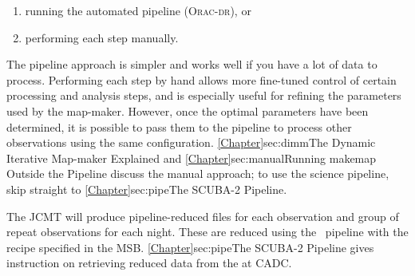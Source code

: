 \begin{enumerate}
\item running the automated pipeline (\textsc{Orac-dr}), or
\item performing each step manually.
\end{enumerate}

The pipeline approach is simpler and works well if you have a
lot of data to process.
Performing each step by hand allows more fine-tuned control of certain
processing and analysis steps, and is especially useful for refining
the parameters used by the map-maker. However, once the optimal
parameters have been determined, it is possible to pass them to the
pipeline to process other observations using the same configuration.
\cref{Chapter}{sec:dimm}{The Dynamic Iterative Map-maker
Explained} and \cref{Chapter}{sec:manual}{Running makemap Outside the
Pipeline} discuss the manual approach; to use the science pipeline,
skip straight to \cref{Chapter}{sec:pipe}{The SCUBA-2 Pipeline}.

The JCMT will produce pipeline-reduced files for each observation and
group of repeat observations for each night. These are reduced using
the \oracdr\ pipeline with the recipe specified in the MSB.
\cref{Chapter}{sec:pipe}{The SCUBA-2 Pipeline} gives instruction on
retrieving reduced data from the  at
CADC.
